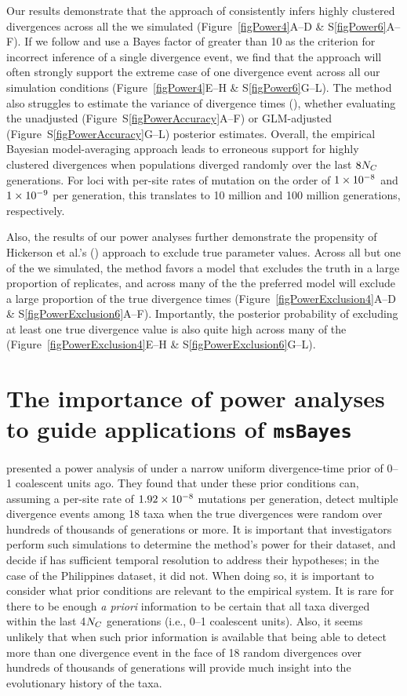 Our results demonstrate that the approach of \citet{Hickerson2013} consistently
infers highly clustered divergences across all the  we simulated
(Figure~\ref{figPower4}A--D \& S\ref{figPower6}A--F).
If we follow \citet{Hickerson2013} and use a Bayes factor of greater than 10 as
the criterion for incorrect inference of a single divergence event, we find
that the approach will often strongly support the extreme case of one
divergence event across all our simulation conditions (Figure~\ref{figPower4}E--H \&
S\ref{figPower6}G--L).
The method also struggles to estimate the variance of divergence times
(\vmratio{}), whether evaluating the unadjusted
(Figure~S\ref{figPowerAccuracy}A--F) or GLM-adjusted
(Figure~S\ref{figPowerAccuracy}G--L) posterior estimates.
Overall, the empirical Bayesian model-averaging approach leads to erroneous
support for highly clustered divergences when populations diverged randomly
over the last $8N_C$ generations.
For loci with per-site rates of mutation on the order of $1\times 10^{-8}$ and
$1\times 10^{-9}$ per generation, this translates to 10 million and 100 million
generations, respectively.

Also, the results of our power analyses further demonstrate the propensity of
Hickerson et al.'s (\citeyear{Hickerson2013}) approach to exclude true
parameter values.
Across all but one of the  we simulated, the method favors a model
that excludes the truth in a large proportion of replicates, and across many of
the  the preferred model will exclude a large proportion of the true
divergence times (Figure~\ref{figPowerExclusion4}A--D \&
S\ref{figPowerExclusion6}A--F).
Importantly, the posterior probability of excluding at least one true
divergence value is also quite high across many of the 
(Figure~\ref{figPowerExclusion4}E--H \& S\ref{figPowerExclusion6}G--L).


\section{The importance of power analyses to guide applications of \texttt{msBayes}}
\citet{Hickerson2013} presented a power analysis of \msb under a narrow uniform
divergence-time prior of 0--1 coalescent units ago.
They found that under these prior conditions \msb can, assuming a
per-site rate of $1.92\times 10^{-8}$ mutations per generation, detect multiple
divergence events among 18 taxa when the true divergences were random over
hundreds of thousands of generations or more.
It is important that investigators perform such simulations to determine the
method's power for their dataset, and decide if \msb has sufficient temporal
resolution to address their hypotheses; in the case of the Philippines dataset,
it did not.
When doing so, it is important to consider what prior conditions are relevant
to the empirical system.
It is rare for there to be enough \emph{a priori} information to be certain
that all taxa diverged within the last 4$N_C$ generations (i.e.,
0--1 coalescent units).
Also, it seems unlikely that when such prior information is available that
being able to detect more than one divergence event in the face of 18 random
divergences over hundreds of thousands of generations will provide much insight
into the evolutionary history of the taxa.

